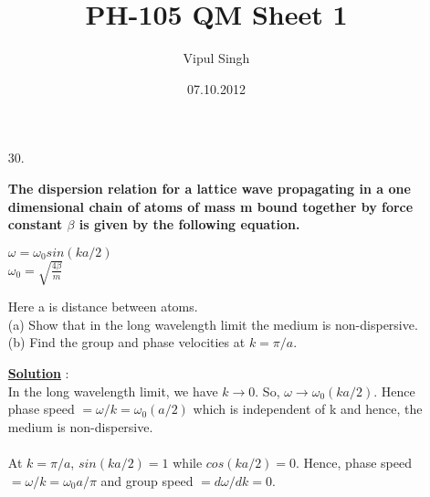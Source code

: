 \documentclass[10pt, a4paper]{article}
\begin{document}
\title{PH-105 QM Sheet 1}
\date{07.10.2012}
\author{Vipul Singh}
\maketitle
\begin{enumerate}
\item[30.]{\bf The dispersion relation for a lattice wave propagating in a one dimensional chain
of atoms of mass m bound together by force constant $\beta$ is given by the following equation.
\begin{center}
$\omega=\omega_{0}sin(ka/2)$\\
$\omega_{0}=\sqrt{\frac{4\beta}{m}}$
\end{center}
Here a is distance between atoms.\\
(a) Show that in the long wavelength limit the medium is non-dispersive.\\
(b) Find the group and phase velocities at $k=\pi/a$.}

{\underline {\bf Solution}} : \\
In the long wavelength limit, we have $k\rightarrow 0$. So, $\omega\rightarrow\omega_{0}(ka/2)$. Hence phase speed $= \omega/k = \omega_{0}(a/2)$ which is independent of k and hence, the medium is non-dispersive.\\
\\ 
At $k=\pi/a$, $sin(ka/2)=1$ while $cos(ka/2)=0$. Hence, phase speed $= \omega/k = \omega_{0}a/\pi$ and group speed $= d\omega/dk = 0$.
\end{enumerate}
\end{document}
